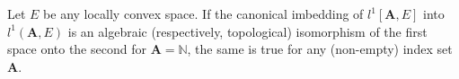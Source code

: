 Let $E$ be any locally convex space. If the canonical imbedding of $l^1[\mathbf{A}, E]$ into $l^1(\mathbf{A}, E)$ is an algebraic (respectively, topological) isomorphism of the first space onto the second for $\mathbf{A} = \mathbb{N}$, the same is true for any (non-empty) index set $\mathbf{A}$.

